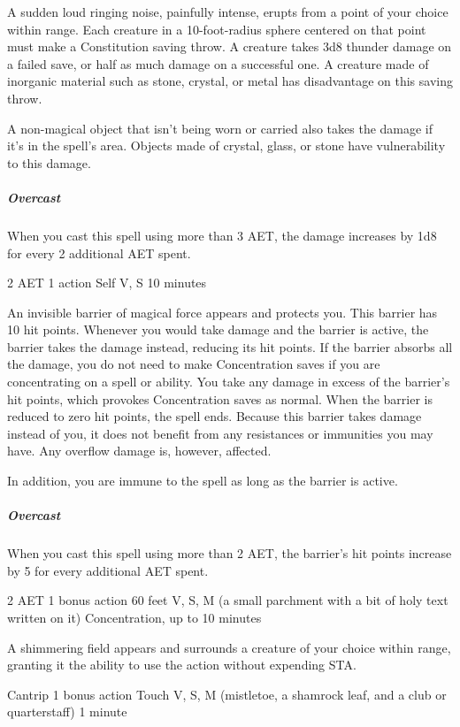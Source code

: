 A sudden loud ringing noise, painfully intense, erupts from a point of your choice within range. Each creature in a 10-foot-radius sphere centered on that point must make a Constitution saving throw. A creature takes 3d8 thunder damage on a failed save, or half as much damage on a successful one. A creature made of inorganic material such as stone, crystal, or metal has disadvantage on this saving throw.

A non-magical object that isn't being worn or carried also takes the damage if it's in the spell's area. Objects made of crystal, glass, or stone have vulnerability to this damage.

\subparagraph*{Overcast} When you cast this spell using more than 3 AET, the damage increases by 1d8 for every 2 additional AET spent.


{2 AET}
{1 action}
{Self}
{V, S}
{10 minutes}

An invisible barrier of magical force appears and protects you. This barrier has 10 hit points. Whenever you would take damage and the barrier is active, the barrier takes the damage instead, reducing its hit points. If the barrier absorbs all the damage, you do not need to make Concentration saves if you are concentrating on a spell or ability. You take any damage in excess of the barrier's hit points, which provokes Concentration saves as normal. When the barrier is reduced to zero hit points, the spell ends. Because this barrier takes damage instead of you, it does not benefit from any resistances or immunities you may have. Any overflow damage is, however, affected.

In addition, you are immune to the  spell as long as the barrier is active.

\subparagraph*{Overcast} When you cast this spell using more than 2 AET, the barrier's hit points increase by 5 for every additional AET spent.


{2 AET}
{1 bonus action}
{60 feet}
{V, S, M (a small parchment with a bit of holy text written on it)}
{Concentration, up to 10 minutes}

A shimmering field appears and surrounds a creature of your choice within range, granting it the ability to use the  action without expending STA.


{Cantrip}
{1 bonus action}
{Touch}
{V, S, M (mistletoe, a shamrock leaf, and a club or quarterstaff)}
{1 minute}

